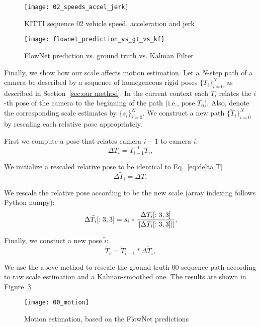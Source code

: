 \begin{figure}[!ht]
  \centering
  \texttt{[image: 02\_speeds\_accel\_jerk]}
  \caption{KITTI sequence 02 vehicle speed, acceleration and jerk}
  \label{fig:02 stats}
\end{figure}

\begin{figure}[!ht]
  \centering
  \texttt{[image: flownet\_prediction\_vs\_gt\_vs\_kf]}
  \caption{FlowNet prediction vs. ground truth vs. Kalman Filter}
  \label{fig:pred_vs_gt_vs_ekf}
\end{figure}

Finally, we show how our scale affects motion estimation.  Let a
$N$-step path of a camera be described by a sequence of homegeneous
rigid poses $\{T_i\}_{i=0}^N$ as described in Section~\ref{sec:our
  method}.  In the current context each $T_i$ relates the $i$-th pose
of the camera to the beginning of the path (i.e., pose $T_0$).  Also,
denote the corresponding scale estimates by $\{s_i\}_{i=0}^N$.  We
construct a new path $\{\tilde{T}_i\}_{i=0}^N$ by rescaling each
relative pose appropriately.

First we compute a pose that relates camera $i-1$ to camera $i$:
\begin{equation}\label{eq:delta T}
  \Delta T_i = T_{i-1}^{-1}T_i,
\end{equation}

We initialize a rescaled relative pose to be identical to Eq.~\ref{eq:delta T}
\begin{equation}
  \Delta \tilde{T}_i = \Delta T,
\end{equation}

We rescale the relative pose according to be the new scale (array
indexing follows Python numpy):
\begin{equation}
  \Delta \tilde{T}_i[:3,3] = s_i * \frac{\Delta T_i[:3,3]}{\lVert\Delta T_i[:3,3]\rVert},
\end{equation}

Finally, we constuct a new pose $\tilde{i}$:
\begin{equation}
  \tilde{T}_i = \tilde{T}_{i-1} * \Delta \tilde{T}_i,
\end{equation}

We use the above method to rescale the ground truth 00 sequence path
according to raw scale estimation and a Kalman-smoothed one.  The
results are shown in Figure~\ref{fig:00_motion}
\begin{figure}[!ht]
  \centering
  \texttt{[image: 00\_motion]}
  \caption{Motion estimation, based on the FlowNet predictions}
  \label{fig:00_motion}
\end{figure}

